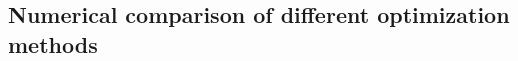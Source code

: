 \documentclass[preprint,12pt]{elsarticle}
\begin{document}
\subsection{Numerical comparison of different optimization methods}
%
\end{document}
